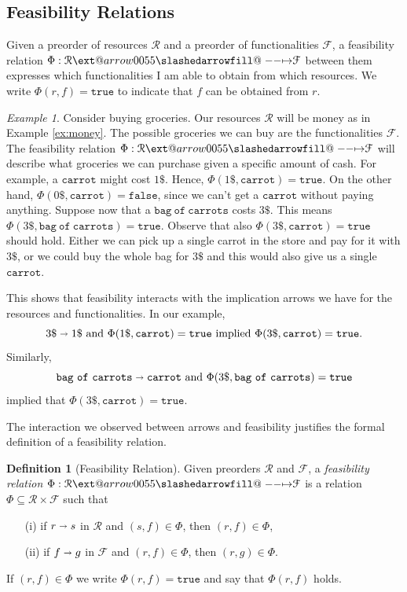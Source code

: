 \documentclass[12pt]{article}
\makeatletter
\theoremstyle{definition}
\newtheorem{definition}{Definition}[section]
\theoremstyle{plain}
\theoremstyle{plain}
\theoremstyle{plain}
\theoremstyle{plain}
\theoremstyle{remark}
\newtheorem{example}{Example}[section]
\theoremstyle{remark}
\newcommand{\mc}[1]{\mathcal{#1}}
\newcommand{\sub}{\subseteq}
\newcommand{\true}{\mathtt{true}}
\def\slashedarrowfill@#1#2#3#4#5{%
	$\m@th\thickmuskip0mu\medmuskip\thickmuskip\thinmuskip\thickmuskip
	\relax#5#1\mkern-7mu%
	\cleaders\hbox{$#5\mkern-2mu#2\mkern-2mu$}\hfill
	\mathclap{#3}\mathclap{#2}%
	\cleaders\hbox{$#5\mkern-2mu#2\mkern-2mu$}\hfill
	\mkern-7mu#4$%
}
\def\rightslashedarrowfill@{%
	\slashedarrowfill@\relbar\relbar\mapstochar\rightarrow}
\newcommand\xslashedrightarrow[2][]{%
	\ext@arrow 0055{\rightslashedarrowfill@}{#1}{#2}}
\makeatother
\begin{document}
\subsection{Feasibility Relations}
Given a preorder of resources $\mc{R}$ and a preorder of functionalities $\mc{F}$, a feasibility relation $\Phi: \mc{R} \xslashedrightarrow{} \mc{F}$ between them expresses which functionalities I am able to obtain from which resources. We write $\Phi(r,f) = \mathtt{true}$ to indicate that $f$ can be obtained from $r$.

\begin{example}\label{ex:groceries}
	Consider buying groceries. Our resources $\mc{R}$ will be money as in Example \ref{ex:money}. The possible groceries we can buy are the functionalities $\mc{F}$. The feasibility relation $\Phi: \mc{R} \xslashedrightarrow{} \mc{F}$ will describe what groceries we can purchase given a specific amount of cash. For example, a $\mathtt{carrot}$ might cost $1\$$. Hence, $\Phi(1\$,\mathtt{carrot}) = \mathtt{true}$. On the other hand, $\Phi(0\$, \mathtt{carrot}) = \mathtt{false}$, since we can't get a $\mathtt{carrot}$ without paying anything. Suppose now that a $\mathtt{bag\ of\ carrots}$ costs $3\$$. This means $\Phi(3\$,\mathtt{bag\ of\ carrots}) = \mathtt{true}$. Observe that also $\Phi(3\$,\mathtt{carrot}) = \true$ should hold. Either we can pick up a single carrot in the store and pay for it with $3\$$, or we could buy the whole bag for $3\$$ and this would also give us a single $\mathtt{carrot}$. 
	
	This shows that feasibility interacts with the implication arrows we have for the resources and functionalities. In our example,
	$$3\$ \shortrightarrow 1\$ \text{ and } \Phi(1\$, \mathtt{carrot}) = \true  \text{ implied } \Phi(3\$, \mathtt{carrot}) = \true.$$ 
	Similarly, 
	$$\mathtt{bag\ of\ carrots} \shortrightarrow \mathtt{carrot}  \text{ and } \Phi(3\$,\mathtt{bag\ of\ carrots}) = \mathtt{true} $$ 
	implied that $\Phi(3\$,\mathtt{carrot}) = \true.$
\end{example}

The interaction we observed between arrows and feasibility justifies the formal definition of a feasibility relation.

\begin{definition}[Feasibility Relation]\label{def:feasibility}
	Given preorders $\mc{R}$ and $\mc{F}$, a \emph{feasibility relation} $\Phi: \mc{R} \xslashedrightarrow{} \mc{F}$ is a relation $\Phi \sub \mc{R} \times \mc{F}$ such that
	\begin{itemize}
		\item[(i)] if $r \shortrightarrow s$ in $\mc{R}$ and $(s,f) \in \Phi$, then $(r,f) \in \Phi$,
		\item[(ii)] if $f \shortrightarrow g$ in $\mc{F}$ and $(r,f) \in \Phi$, then $(r,g) \in \Phi$.
	\end{itemize}
	If $(r,f) \in \Phi$ we write $\Phi(r,f) = \true$ and say that $\Phi(r,f)$ holds.
\end{definition}
\end{document}
